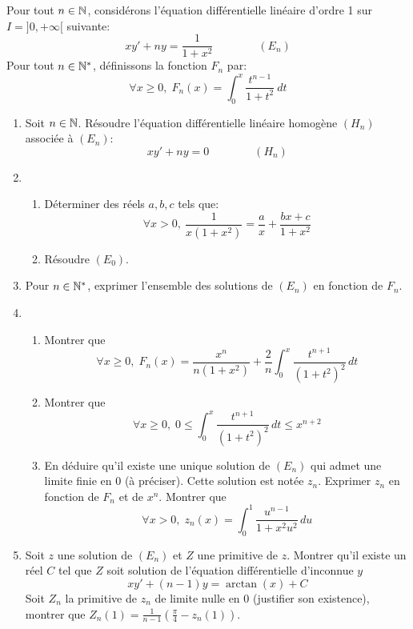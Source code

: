 
Pour tout $n\in \mathbb{N}$, considérons l'équation différentielle linéaire d'ordre 1 sur $I = ]0,+\infty [$ suivante:
\[ xy'+ny = \frac{1}{1+x^{2}} \qquad \qquad (E_{n})\]
Pour tout $n\in \mathbb{N}^{*}$, définissons la fonction $F_{n}$ par:
\begin{displaymath}
\forall x\geq0,\; F_{n}(x) = \int_{0}^{x}\frac{t^{n-1}}{1+t^{2}}\ dt  
\end{displaymath}

\begin{enumerate}
\item Soit $n\in \mathbb{N}$. Résoudre l'équation différentielle linéaire homogène $(H_{n})$ associée à $(E_{n})$:
\[ xy'+ny = 0 \qquad \qquad (H_{n})\]

 

\item \begin{enumerate}
                   \item Déterminer des réels $a,b,c$ tels que:
                   \[\forall x>0,\ \frac{1}{x(1+x^{2})} = \frac{a}{x} + \frac{bx+c}{1+x^{2}} \]
                   \item Résoudre $(E_{0})$.
          \end{enumerate}
          
\item Pour $n\in \mathbb{N}^{*}$, exprimer l'ensemble des solutions de $(E_{n})$ en fonction de $F_{n}$.

\item 
\begin{enumerate}
  \item Montrer que
\begin{displaymath}
\forall x\geq 0,\; F_n(x) = \frac{x^n}{n(1+x^2)} + \frac{2}{n}\int_0^x\frac{t^{n+1}}{(1+t^2)^2}\,dt  
\end{displaymath}
  \item Montrer que 
\begin{displaymath}
\forall x\geq 0,\; 0 \leq \int_0^x\frac{t^{n+1}}{(1+t^2)^2}\,dt \leq x^{n+2}  
\end{displaymath}
  \item En déduire qu'il existe une unique solution de $(E_n)$ qui admet une limite finie en $0$ (à préciser). Cette solution est notée $z_n$. Exprimer $z_n$ en fonction de $F_n$ et de $x^n$. Montrer que
\begin{displaymath}
  \forall x>0,\; z_n(x) = \int_0^1\frac{u^{n-1}}{1+x^2u^2}\,du
\end{displaymath}

\end{enumerate}

\item Soit $z$ une solution de $(E_n)$ et $Z$ une primitive de $z$. Montrer qu'il existe un réel $C$ tel que $Z$ soit solution de l'équation différentielle d'inconnue $y$
\begin{displaymath}
  xy'+(n-1)y = \arctan(x) + C
\end{displaymath}
Soit $Z_n$ la primitive de $z_n$ de limite nulle en $0$ (justifier son existence), montrer que $Z_n(1) = \frac{1}{n-1}\left(\frac{\pi}{4} -z_n(1)\right)$. 
\end{enumerate}